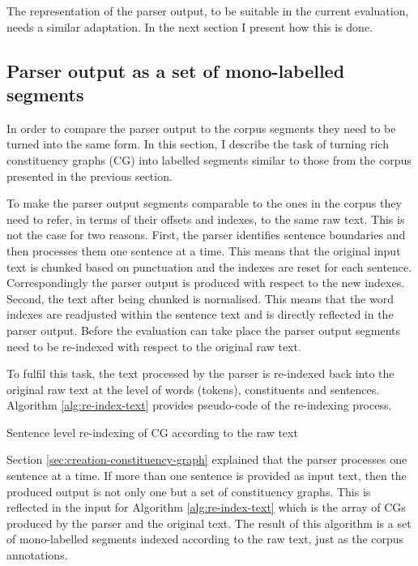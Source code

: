     The representation of the parser output, to be suitable in the current evaluation, needs a similar adaptation. In the next section I present how this is done. 

\subsection{Parser output as a set of mono-labelled segments}
    
    In order to compare the parser output to the corpus segments they need to be turned into the same form. In this section, I describe the task of turning rich constituency graphs (CG) into labelled segments similar to those from the corpus presented in the previous section. 
    
    To make the parser output segments comparable to the ones in the corpus they need to refer, in terms of their offsets and indexes, to the same raw text. This is not the case for two reasons. First, the parser identifies sentence boundaries and then processes them one sentence at a time. This means that the original input text is chunked based on punctuation and the indexes are reset for each sentence. Correspondingly the parser output is produced with respect to the new indexes. Second, the text after being chunked is normalised. This means that the word indexes are readjusted within the sentence text and is directly reflected in the parser output. Before the evaluation can take place the parser output segments need to be re-indexed with respect to the original raw text. 
    
    To fulfil this task, the text processed by the parser is re-indexed back into the original raw text at the level of words (tokens), constituents and sentences. Algorithm \ref{alg:re-index-text} provides pseudo-code of the re-indexing process.
     
    \begin{algorithm}[!ht]
        \caption{Sentence level re-indexing of CG according to the raw text}
        \label{alg:re-index-text}
    \end{algorithm}

    Section \ref{sec:creation-constituency-graph} explained that the parser processes one sentence at a time. If more than one sentence is provided as input text, then the produced output is not only one but a set of constituency graphs. This is reflected in the input for Algorithm \ref{alg:re-index-text} which is the array of CGs produced by the parser and the original text. The result of this algorithm is a set of mono-labelled segments indexed according to the raw text, just as the corpus annotations. 
    

